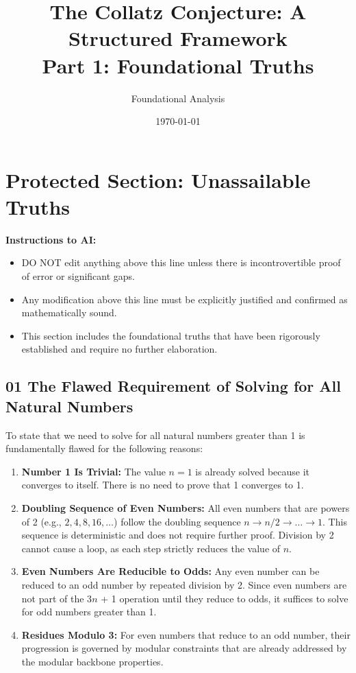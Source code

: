 \documentclass[11pt]{article}
\title{\textbf{The Collatz Conjecture: A Structured Framework\\Part 1: Foundational Truths}}
\author{Foundational Analysis}
\date{\today}
\begin{document}
\maketitle

\section*{\textbf{Protected Section: Unassailable Truths}}

\textbf{Instructions to AI:} 
\begin{itemize}
    \item DO NOT edit anything above this line unless there is incontrovertible proof of error or significant gaps.
    \item Any modification above this line must be explicitly justified and confirmed as mathematically sound.
    \item This section includes the foundational truths that have been rigorously established and require no further elaboration.
\end{itemize}

\subsection*{01 The Flawed Requirement of Solving for All Natural Numbers}

To state that we need to solve for all natural numbers greater than 1 is fundamentally flawed for the following reasons:
\begin{enumerate}
    \item \textbf{Number 1 Is Trivial:} The value \( n = 1 \) is already solved because it converges to itself. There is no need to prove that 1 converges to 1.
    \item \textbf{Doubling Sequence of Even Numbers:} All even numbers that are powers of 2 (e.g., \( 2, 4, 8, 16, \ldots \)) follow the doubling sequence \( n \to n/2 \to \ldots \to 1 \). This sequence is deterministic and does not require further proof. Division by 2 cannot cause a loop, as each step strictly reduces the value of \( n \).
    \item \textbf{Even Numbers Are Reducible to Odds:} Any even number can be reduced to an odd number by repeated division by 2. Since even numbers are not part of the 3\( n \) + 1 operation until they reduce to odds, it suffices to solve for odd numbers greater than 1.
    \item \textbf{Residues Modulo 3:} For even numbers that reduce to an odd number, their progression is governed by modular constraints that are already addressed by the modular backbone properties.
\end{enumerate}
\end{document}
